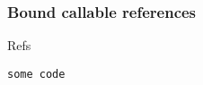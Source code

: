 \begin{frame}[fragile] \frametitle{Bound callable references}
Refs
\begin{lstlisting}
some code
\end{lstlisting}
\end{frame}

